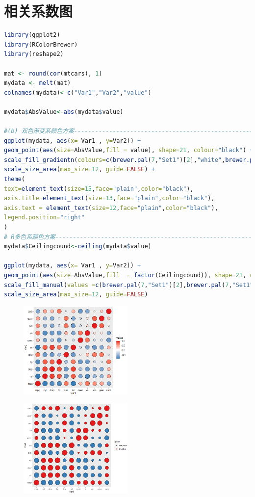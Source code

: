 \documentclass[11pt,a4paper,oneside]{book}
\begin{document}
\section{相关系数图}
\begin{lstlisting}[language=r]
library(ggplot2)  
library(RColorBrewer)  
library(reshape2) 

mat <- round(cor(mtcars), 1)
mydata <- melt(mat)  
colnames(mydata)<-c("Var1","Var2","value")

mydata$AbsValue<-abs(mydata$value)

#(b) 双色渐变系颜色方案---------------------------------------------------------
ggplot(mydata, aes(x= Var1 , y=Var2)) +
geom_point(aes(size=AbsValue,fill = value), shape=21, colour="black") +
scale_fill_gradientn(colours=c(brewer.pal(7,"Set1")[2],"white",brewer.pal(7,"Set1")[1]),na.value=NA)+
scale_size_area(max_size=12, guide=FALSE) +
theme(
text=element_text(size=15,face="plain",color="black"),
axis.title=element_text(size=13,face="plain",color="black"),
axis.text = element_text(size=12,face="plain",color="black"),
legend.position="right"
)
# R多色系颜色方案---------------------------------------------------------
mydata$Ceilingcound<-ceiling(mydata$value)

ggplot(mydata, aes(x= Var1 , y=Var2)) +
geom_point(aes(size=AbsValue,fill  = factor(Ceilingcound)), shape=21, colour="black") +
scale_fill_manual(values =c(brewer.pal(7,"Set1")[2],brewer.pal(7,"Set1")[1]),labels=c('Negative','Positive'),na.value=NA,name="factor")+
scale_size_area(max_size=12, guide=FALSE) 

\end{lstlisting}
\begin{figure}[H]
	\centering
	\includegraphics[width=0.5\textwidth]{screenshot046}
\end{figure}
\begin{figure}[H]
	\centering
	\includegraphics[width=0.5\textwidth]{screenshot047}
\end{figure}
\end{document}
